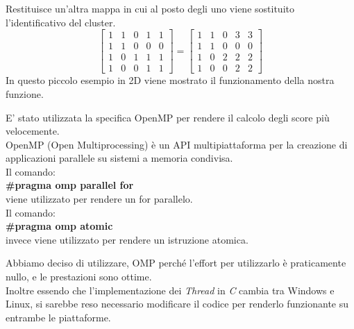 \documentclass{beamer}
\begin{document}
\begin{frame}
Restituisce un'altra mappa in cui al posto degli uno viene sostituito l'identificativo del cluster.
\[
\begin{bmatrix}
    1       & 1 & 0 & 1 & 1\\
    1       & 1 & 0 & 0 & 0 \\
    1       & 0 & 1 & 1 & 1 \\
    1       & 0 & 0 & 1 & 1
\end{bmatrix}
=
\begin{bmatrix}
    1       & 1 & 0 & 3 & 3\\
    1       & 1 & 0 & 0 & 0 \\
    1       & 0 & 2 & 2 & 2 \\
    1       & 0 & 0 & 2 & 2
\end{bmatrix}
\]
In questo piccolo esempio in 2D viene mostrato il funzionamento della nostra funzione.
\end{frame}

\begin{frame}[fragile]
E' stato utilizzata la specifica OpenMP per rendere il calcolo degli score più velocemente.\\
\medskip
OpenMP (Open Multiprocessing) è un API multipiattaforma per la creazione di applicazioni parallele su sistemi a memoria condivisa.\\
\smallskip
Il comando:\\
\textbf{\#pragma omp parallel for}\\
viene utilizzato per rendere un for parallelo.\\
\smallskip
Il comando:\\
\textbf{\#pragma omp atomic}\\
invece viene utilizzato per rendere un istruzione atomica.\\
\end{frame}

\begin{frame}
Abbiamo deciso di utilizzare, OMP perché l'effort per utilizzarlo è praticamente nullo, e le prestazioni sono ottime.\\
\medskip
Inoltre essendo che l'implementazione dei \textit{Thread} in \textit{C} cambia tra Windows e Linux, si sarebbe reso necessario modificare il codice per renderlo funzionante su entrambe le piattaforme.
\end{frame}
\end{document}
